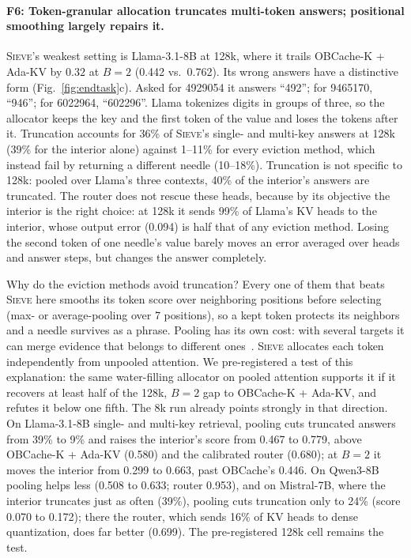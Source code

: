 \documentclass{article}
\newif\ifshowtbd \showtbdtrue
\newcommand{\tbd}[1]{\ifshowtbd{\color{tbdcol}\textbf{TBD}~#1}\else\ifhmode\unskip\fi\fi}
\newif\ifshowest \showesttrue
\DeclareRobustCommand{\est}[1]{\ifshowest{\color{estcol}#1$^{\dagger}$}\else---\fi}
\DeclareRobustCommand{\estonly}[1]{\ifshowest#1\else\ifhmode\unskip\fi\fi}
\newcommand{\sieve}{\textsc{Sieve}}
\theoremstyle{definition}
\begin{document}
\paragraph{F6: Token-granular allocation truncates multi-token answers; positional smoothing largely repairs it.}
\sieve{}'s weakest setting is Llama-3.1-8B at 128k, where it trails OBCache-K + Ada-KV by $0.32$ at $B=2$ (0.442 vs.\ 0.762).  Its wrong answers have a distinctive form (Fig.~\ref{fig:endtask}c).  Asked for 4929054 it answers ``492''; for 9465170, ``946''; for 6022964, ``602296''.  Llama tokenizes digits in groups of three, so the allocator keeps the key and the first token of the value and loses the tokens after it.  Truncation accounts for 36\% of \sieve{}'s single- and multi-key answers at 128k (39\% for the interior alone) against 1--11\% for every eviction method, which instead fail by returning a different needle (10--18\%).  Truncation is not specific to 128k: pooled over Llama's three contexts, 40\% of the interior's answers are truncated.  The router does not rescue these heads, because by its objective the interior is the right choice: at 128k it sends 99\% of Llama's KV heads to the interior, whose output error (0.094) is half that of any eviction method.  Losing the second token of one needle's value barely moves an error averaged over heads and answer steps, but changes the answer completely.

Why do the eviction methods avoid truncation?  Every one of them that beats \sieve{} here smooths its token score over neighboring positions before selecting (max- or average-pooling over 7 positions), so a kept token protects its neighbors and a needle survives as a phrase.  Pooling has its own cost: with several targets it can merge evidence that belongs to different ones~\citep{zhang2026fixedcontract}.  \sieve{} allocates each token independently from unpooled attention.  We pre-registered a test of this explanation: the same water-filling allocator on pooled attention supports it if it recovers at least half of the 128k, $B=2$ gap to OBCache-K + Ada-KV, and refutes it below one fifth.  The 8k run already points strongly in that direction.  On Llama-3.1-8B single- and multi-key retrieval, pooling cuts truncated answers from 39\% to 9\% and raises the interior's score from 0.467 to 0.779, above OBCache-K + Ada-KV (0.580) and the calibrated router (0.680); at $B=2$ it moves the interior from 0.299 to 0.663, past OBCache's 0.446.  On Qwen3-8B pooling helps less (0.508 to 0.633; router 0.953), and on Mistral-7B, where the interior truncates just as often (39\%), pooling cuts truncation only to 24\% (score 0.070 to 0.172); there the router, which sends 16\% of KV heads to dense quantization, does far better (0.699).  The pre-registered 128k cell remains the test. 
\end{document}
